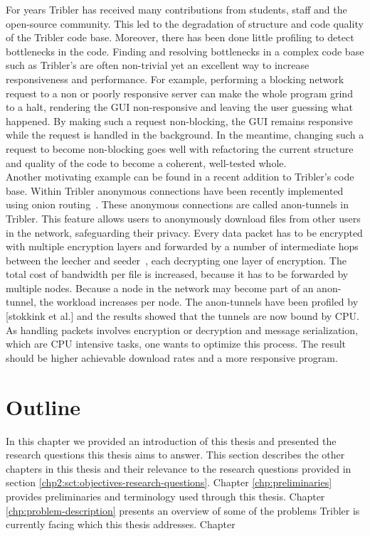 For years Tribler has received many contributions from students, staff and the open-source community.
This led to the degradation of structure and code quality of the Tribler code base.
Moreover, there has been done little profiling to detect bottlenecks in the code.
Finding and resolving bottlenecks in a complex code base such as Tribler's are often non-trivial yet an excellent way to increase responsiveness and performance.
For example, performing a blocking network request to a non or poorly responsive server can make the whole program grind to a halt, rendering the GUI non-responsive and leaving the user guessing what happened.
By making such a request non-blocking, the GUI remains responsive while the request is handled in the background.
In the meantime, changing such a request to become non-blocking goes well with refactoring the current structure and quality of the code to become a coherent, well-tested whole.\\

Another motivating example can be found in a recent addition to Tribler's code base.
Within Tribler anonymous connections have been recently implemented using onion routing~\cite{Plak-anonymous,ruigrok-anonymous,tanaskoski-anonymous}.
These anonymous connections are called anon-tunnels in Tribler.
This feature allows users to anonymously download files from other users in the network, safeguarding their privacy.
Every data packet has to be encrypted with multiple encryption layers and forwarded by a number of intermediate hops between the leecher and seeder~\cite{Plak-anonymous,tanaskoski-anonymous}, each decrypting one layer of encryption.
The total cost of bandwidth per file is increased, because it has to be forwarded by multiple nodes.
Because a node in the network may become part of an anon-tunnel, the workload increases per node.
The anon-tunnels have been profiled by [stokkink et al.]  and the results showed that the tunnels are now bound by CPU.
As handling packets involves encryption or decryption and message serialization, which are CPU intensive tasks, one wants to optimize this process.
The result should be higher achievable download rates and a more responsive program.

\section{Outline}
In this chapter we provided an introduction of this thesis and presented the research questions this thesis aims to answer. 
This section describes the other chapters in this thesis and their relevance to the research questions provided in section \ref{chp2:sct:objectives-research-questions}.
Chapter \ref{chp:preliminaries} provides preliminaries and terminology used through this thesis.
Chapter \ref{chp:problem-description} presents an overview of some of the problems Tribler is currently facing which this thesis addresses.
Chapter 
